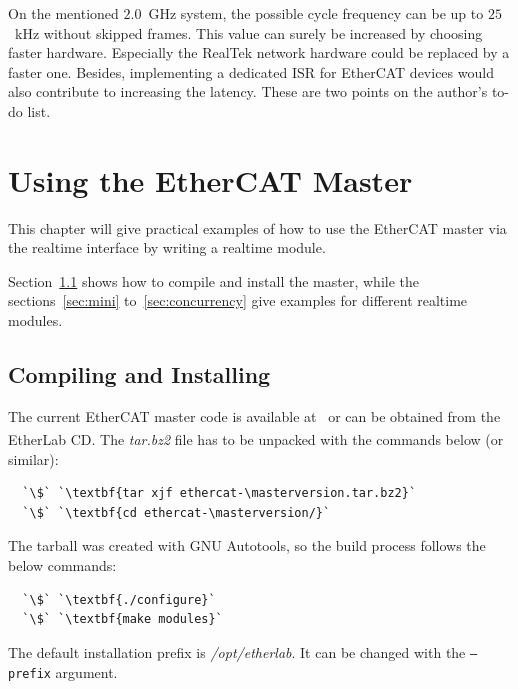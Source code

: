 \documentclass[a4paper,12pt,BCOR6mm,bibtotoc,idxtotoc]{scrbook}
\newcommand{\masterversion}{1.1.1}
\begin{document}
On the mentioned $2.0$~GHz system, the possible cycle frequency can be
up to $25$~kHz without skipped frames. This value can surely be
increased by choosing faster hardware. Especially the RealTek network
hardware could be replaced by a faster one. Besides, implementing a
dedicated ISR for EtherCAT devices would also contribute to increasing
the latency. These are two points on the author's to-do list.


\chapter{Using the EtherCAT Master}
\label{chapter:usage}

This chapter will give practical examples of how to use the EtherCAT
master via the realtime interface by writing a realtime module.

Section~\ref{sec:make} shows how to compile and install the master,
while the sections~\ref{sec:mini} to~\ref{sec:concurrency} give
examples for different realtime modules.


\section{Compiling and Installing}
\label{sec:make}

The current EtherCAT master code is available at~\cite{etherlab} or
can be obtained from the EtherLab\textsuperscript{\textregistered} CD.
The \textit{tar.bz2} file has to be unpacked with the commands below
(or similar):

\begin{lstlisting}
  `\$` `\textbf{tar xjf ethercat-\masterversion.tar.bz2}`
  `\$` `\textbf{cd ethercat-\masterversion/}`
\end{lstlisting}

The tarball was created with GNU Autotools, so the build process
follows the below commands:

\begin{lstlisting}
  `\$` `\textbf{./configure}`
  `\$` `\textbf{make modules}`
\end{lstlisting}

The default installation prefix is \textit{/opt/etherlab}. It can be
changed with the \texttt{--prefix} argument.
\end{document}
